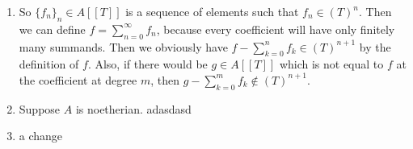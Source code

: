 \newcommand{\sheet}{3}




\maketitle

\begin{exercise}{1}
    \begin{enumerate}
        \item So $\{f_n\}_n \in A[[T]]$ is a sequence of elements such that $f_n
            \in {(T)}^n$. Then we can define $f = \sum^{\infty}_{n = 0} f_n$,
            because every coefficient will have only finitely many summands.
            Then we obviously have $f - \sum^{n}_{k = 0} f_k \in {(T)}^{n+1}$ by
            the definition of $f$. Also, if there would be $g \in A[[T]]$ which
            is not equal to $f$ at the coefficient at degree $m$, then $g -
            \sum^{m}_{k = 0} f_k \notin {(T)}^{n+1}$.
        \item Suppose $A$ is noetherian. adasdasd
        \item a change
    \end{enumerate}
\end{exercise}


